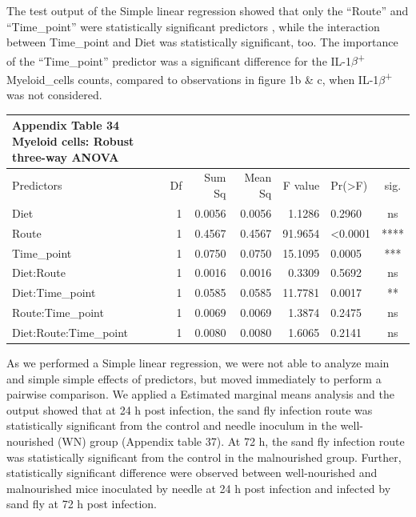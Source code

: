 \documentclass[
  12pt,
  letterpaper,
]{article}
\begin{document}
The test output of the Simple linear regression showed that only the ``Route'' and ``Time\_point'' were statistically significant predictors , while the interaction between Time\_point and Diet was statistically significant, too. The importance of the ``Time\_point'' predictor was a significant difference for the IL-1\(\beta\)\textsuperscript{+} Myeloid\_cells counts, compared to observations in figure 1b \& c, when IL-1\(\beta\)\textsuperscript{+} was not considered.

\begingroup
\fontsize{12.0pt}{14.4pt}\selectfont
\begin{longtable}{l|rrrrlc}
\caption*{
{\large \textbf{Appendix Table 34}} \\ 
{\small \textbf{Myeloid cells: Robust three-way ANOVA}}
} \\ 
\toprule
Predictors & {Df} & {Sum Sq} & {Mean Sq} & {F value} & {Pr(>F)} & {sig.} \\ 
\midrule\addlinespace[2.5pt]
Diet & 1 & 0.0056 & 0.0056 & 1.1286 & 0.2960 & ns \\ 
Route & 1 & 0.4567 & 0.4567 & 91.9654 & <0.0001 & **** \\ 
Time\_point & 1 & 0.0750 & 0.0750 & 15.1095 & 0.0005 & *** \\ 
Diet:Route & 1 & 0.0016 & 0.0016 & 0.3309 & 0.5692 & ns \\ 
Diet:Time\_point & 1 & 0.0585 & 0.0585 & 11.7781 & 0.0017 & ** \\ 
Route:Time\_point & 1 & 0.0069 & 0.0069 & 1.3874 & 0.2475 & ns \\ 
Diet:Route:Time\_point & 1 & 0.0080 & 0.0080 & 1.6065 & 0.2141 & ns \\ 
\bottomrule
\end{longtable}
\endgroup

As we performed a Simple linear regression, we were not able to analyze main and simple simple effects of predictors, but moved immediately to perform a pairwise comparison. We applied a Estimated marginal means analysis and the output showed that at 24 h post infection, the sand fly infection route was statistically significant from the control and needle inoculum in the well-nourished (WN) group (Appendix table 37). At 72 h, the sand fly infection route was statistically significant from the control in the malnourished group. Further, statistically significant difference were observed between well-nourished and malnourished mice inoculated by needle at 24 h post infection and infected by sand fly at 72 h post infection.
\end{document}

